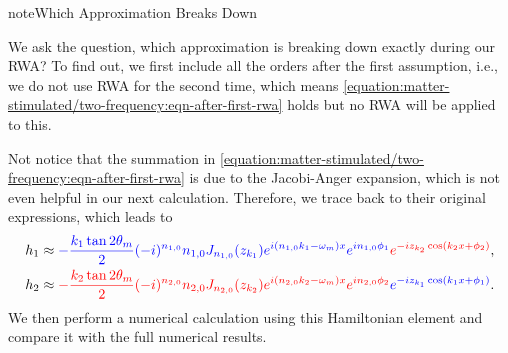 \documentclass[letterpaper,12pt,english]{sphinxmanual}
\begin{document}
\begin{sphinxadmonition}{note}{Which Approximation Breaks Down}

We ask the question, which approximation is breaking down exactly during our RWA? To find out, we first include all the orders after the first assumption, i.e., we do not use RWA for the second time, which means \eqref{equation:matter-stimulated/two-frequency:eqn-after-first-rwa} holds but no RWA will be applied to this.

Not notice that the summation in \eqref{equation:matter-stimulated/two-frequency:eqn-after-first-rwa} is due to the Jacobi-Anger expansion, which is not even helpful in our next calculation. Therefore, we trace back to their original expressions, which leads to
\begin{equation*}
\begin{split}h_1 & \approx {\color{blue}-\frac{k_1 \tan 2\theta_m}{2} (-i)^{n_{1,0}} n_{1,0} J_{n_{1,0}} (z_{k_1}) e^{i (n_{1,0} k_1-\omega_m)x} e^{i n_{1,0}\phi_1} } {\color{red} e^{-i z_{k_2} \cos(k_2 x+\phi_2)  } }, \\
h_2 & \approx {\color{red} - \frac{k_2\tan 2\theta_m}{2} (-i)^{n_{2,0}} n_{2,0} J_{n_{2,0}}(z_{k_2}) e^{i(n_{2,0}k_2-\omega_m)x} e^{i n_{2,0} \phi_2}  }{\color{blue}  e^{-i z_{k_1} \cos(k_1 x+\phi_1)  } }.\end{split}
\end{equation*}
We then perform a numerical calculation using this Hamiltonian element and compare it with the full numerical results.
\end{sphinxadmonition}
\end{document}
